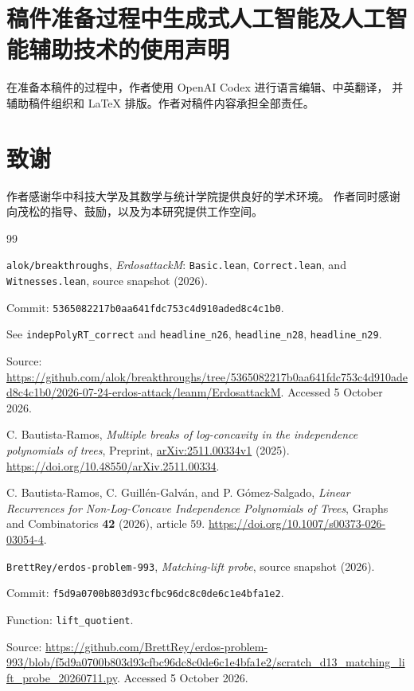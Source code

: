 \documentclass[UTF8,11pt,a4paper,fontset=fandol]{ctexart}
\theoremstyle{remark}
\numberwithin{equation}{section}
\begin{document}
\section*{稿件准备过程中生成式人工智能及人工智能辅助技术的使用声明}
在准备本稿件的过程中，作者使用 OpenAI Codex 进行语言编辑、中英翻译，
并辅助稿件组织和 LaTeX 排版。作者对稿件内容承担全部责任。

\section*{致谢}
作者感谢华中科技大学及其数学与统计学院提供良好的学术环境。
作者同时感谢向茂松的指导、鼓励，以及为本研究提供工作空间。

\begin{thebibliography}{99}

\nolinkurl{alok/breakthroughs},
\emph{ErdosattackM}: \nolinkurl{Basic.lean}, \nolinkurl{Correct.lean},
and \nolinkurl{Witnesses.lean}, source snapshot (2026).
\par Commit: \nolinkurl{5365082217b0aa641fdc753c4d910aded8c4c1b0}.
\par See \nolinkurl{indepPolyRT_correct} and
\nolinkurl{headline_n26}, \nolinkurl{headline_n28}, \nolinkurl{headline_n29}.
\par Source: \url{https://github.com/alok/breakthroughs/tree/5365082217b0aa641fdc753c4d910aded8c4c1b0/2026-07-24-erdos-attack/leanm/ErdosattackM}.
Accessed 5 October 2026.

C. Bautista-Ramos,
\emph{Multiple breaks of log-concavity in the independence polynomials of trees},
Preprint, \href{https://arxiv.org/abs/2511.00334v1}{arXiv:2511.00334v1} (2025).
\url{https://doi.org/10.48550/arXiv.2511.00334}.

C. Bautista-Ramos, C. Guill\'en-Galv\'an, and P. G\'omez-Salgado,
\emph{Linear Recurrences for Non-Log-Concave Independence Polynomials
of Trees}, Graphs and Combinatorics \textbf{42} (2026), article 59.
\url{https://doi.org/10.1007/s00373-026-03054-4}.

\nolinkurl{BrettRey/erdos-problem-993},
\emph{Matching-lift probe}, source snapshot (2026).
\par Commit: \nolinkurl{f5d9a0700b803d93cfbc96dc8c0de6c1e4bfa1e2}.
\par Function: \nolinkurl{lift_quotient}.
\par Source: \url{https://github.com/BrettRey/erdos-problem-993/blob/f5d9a0700b803d93cfbc96dc8c0de6c1e4bfa1e2/scratch_d13_matching_lift_probe_20260711.py}.
Accessed 5 October 2026.


\end{thebibliography}
\end{document}
